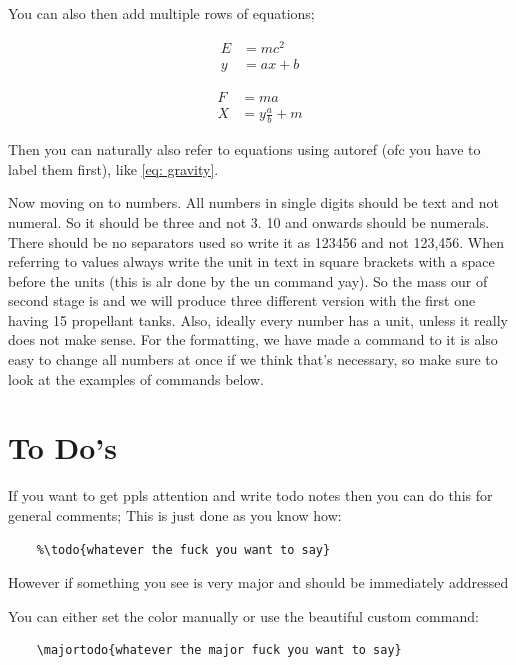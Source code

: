 \documentclass[../main.tex]{subfiles}
\begin{document}
You can also then add multiple rows of equations;
\begin{multicols}{2}
\begin{align}
E &= mc^2 \\
y &= ax + b
\end{align}

\begin{align}
F &= ma \\
X &= y\frac{a}{b} + m
\end{align}
\end{multicols}

Then you can naturally also refer to equations using autoref (ofc you have to label them first), like \autoref{eq: gravity}.

Now moving on to numbers. All numbers in single digits should be text and not numeral. So it should be three and not 3. 10 and onwards should be numerals. There should be no separators used so write it as 123456 and not 123,456. When referring to values always write the unit in text in square brackets with a space before the units (this is alr done by the un command yay). So the mass our of second stage is  and we will produce three different version with the first one having 15 propellant tanks. Also, ideally every number has a unit, unless it really does not make sense. For the formatting, we have made a command to it is also easy to change all numbers at once if we think that's necessary, so make sure to look at the examples of commands below.

\section{To Do's}

If you want to get ppls attention and write todo notes then you can do this for general comments;
This is just done as you know how:

\begin{verbatim}
    %\todo{whatever the fuck you want to say}
\end{verbatim}

However if something you see is very major and should be immediately addressed

You can either set the color manually or use the beautiful custom command:

\begin{verbatim}
    \majortodo{whatever the major fuck you want to say}
\end{verbatim}
\end{document}
